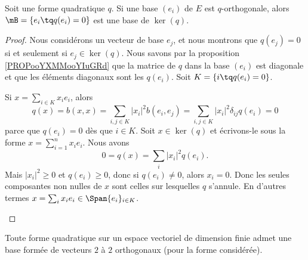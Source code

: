 \begin{proposition}     \label{PROPooZYISooQZNgeo}
	Soit une forme quadratique \( q\). Si une base \( (e_i )\) de \( E\) est \( q\)-orthogonale, alors \( \mB=\{ e_i\tq q(e_i)=0 \}\) est une base de \( \ker(q)\).
\end{proposition}

\begin{proof}
	Nous considérons un vecteur de base \( e_j\), et nous montrons que \( q(e_j)=0\) si et seulement si \( e_j\in\ker(q)\). Nous savons par la proposition \ref{PROPooYXMMooYIuGRd} que la matrice de \( q\) dans la base \( (e_i)\) est diagonale et que les éléments diagonaux sont les \( q(e_i)\). Soit \( K=\{ i\tq q(e_i)=0 \}\).
	\begin{subproof}
		Si \( x=\sum_{i\in K}x_ie_i\), alors
		\begin{equation}
			q(x)=b(x,x)=\sum_{i,j\in K}| x_i |^2b(e_i,e_j)=\sum_{i,j\in K}| x_i |^2\delta_{ij}q(e_i)=0
		\end{equation}
		parce que \( q(e_i)=0\) dès que \( i\in K\).
		Soit \( x\in \ker(q)\) et écrivons-le sous la forme \( x=\sum_{i=1}^nx_ie_i\). Nous avons
		\begin{equation}
			0=q(x)=\sum_i| x_i |^2q(e_i).
		\end{equation}
		Mais \(    | x_i |^2\geq 0 \) et \( q(e_i)\geq 0\), donc si \( q(e_i)\neq 0\), alors \( x_i=0\). Donc les seules composantes non nulles de \( x\) sont celles sur lesquelles \( q\) s'annule. En d'autres termes \( x=\sum_ix_ie_i\in \Span\{ e_i \}_{i\in K}\).
	\end{subproof}
\end{proof}

\begin{theorem}       \label{THOooIDMPooIMwkqB}
	Toute forme quadratique sur un espace vectoriel de dimension finie admet une base formée de vecteurs \( 2\) à \( 2\) orthogonaux (pour la forme considérée).
\end{theorem}

